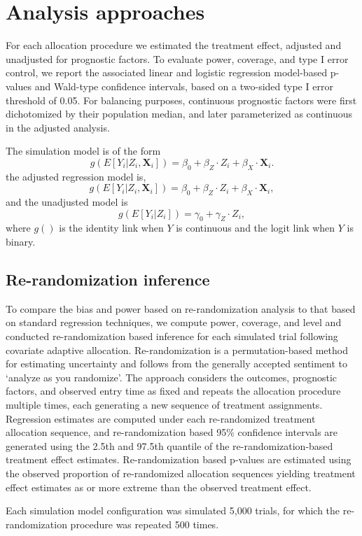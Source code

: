\endgroup{}

\section{Analysis approaches}
For each allocation procedure we estimated the treatment effect, adjusted and unadjusted for prognostic factors.  To evaluate power, coverage, and type I error control, we report the associated linear and logistic regression model-based p-values and Wald-type confidence intervals, based on a two-sided type I error threshold of 0.05.  For balancing purposes, continuous prognostic factors were first dichotomized by their population median, and later parameterized as continuous in the adjusted analysis.

The simulation model is of the form
\begin{equation}
g(E[Y_i|Z_i, \mathbf{X}_i]) = \beta_0 + \beta_Z \cdot Z_i + \beta_X \cdot \mathbf{X}_{i}.
\end{equation}
the adjusted regression model is,
\begin{equation}
g(E[Y_i|Z_i, \mathbf{X}_i]) = \beta_0 + \beta_Z \cdot Z_i + \beta_X \cdot \mathbf{X}_{i},
\end{equation}
and the unadjusted model is
\begin{equation}
g(E[Y_i|Z_i]) = \gamma_0 + \gamma_Z \cdot Z_i,
\end{equation}
where $g()$ is the identity link when $Y$ is continuous and the logit link when $Y$ is binary.

\subsection{Re-randomization inference}
To compare the bias and power based on re-randomization analysis to that based on standard regression techniques, we compute power, coverage, and level and conducted re-randomization based inference for each simulated trial following covariate adaptive allocation.  
Re-randomization is a permutation-based method for estimating uncertainty and follows from the generally accepted sentiment to ‘analyze as you randomize’.  
The approach considers the outcomes, prognostic factors, and observed entry time as fixed and repeats the allocation procedure multiple times, each generating a new sequence of treatment assignments.  
Regression estimates are computed under each re-randomized treatment allocation sequence, and re-randomization based 95\% confidence intervals are generated using the 2.5th and 97.5th quantile of the re-randomization-based treatment effect estimates.  
Re-randomization based p-values are estimated using the observed proportion of re-randomized allocation sequences yielding treatment effect estimates as or more extreme than the observed treatment effect.  

Each simulation model configuration was simulated 5,000 trials, for which the re-randomization procedure was repeated 500 times.

